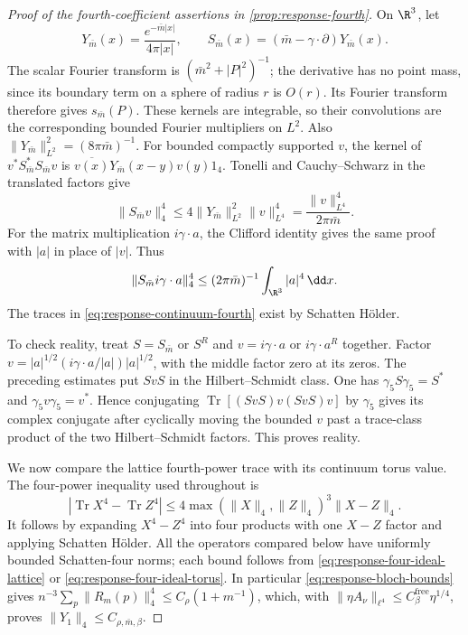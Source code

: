 \documentclass[11pt,letterpaper,reqno]{amsart}
\begin{document}
\begin{proof}[Proof of the fourth-coefficient assertions in \cref{prop:response-fourth}]
On $\R^3$, let
\[
 Y_{\bar m}(x)=\frac{e^{-\bar m|x|}}{4\pi|x|},\qquad
 S_{\bar m}(x)=(\bar m-\gamma\cdot\partial)Y_{\bar m}(x).
\]
The scalar Fourier transform is $(\bar m^2+|P|^2)^{-1}$;
the derivative has no point mass, since its boundary
term on a sphere of radius $r$ is $O(r)$. Its Fourier
transform therefore gives $s_{\bar m}(P)$. These kernels
are integrable, so their convolutions are the corresponding
bounded Fourier multipliers on $L^2$. Also
$\|Y_{\bar m}\|_{L^2}^2=(8\pi\bar m)^{-1}$.
For bounded compactly supported $v$, the kernel of
$v^*S_{\bar m}^*S_{\bar m}v$ is
$\overline{v(x)}Y_{\bar m}(x-y)v(y)1_4$. Tonelli and
Cauchy--Schwarz in the translated factors give
\[
 \|S_{\bar m}v\|_4^4
   \le4\|Y_{\bar m}\|_{L^2}^2\|v\|_{L^4}^4
   =\frac{\|v\|_{L^4}^4}{2\pi\bar m}.
\]
For the matrix multiplication $i\gamma\cdot a$, the
Clifford identity gives the same proof with $|a|$ in
place of $|v|$. Thus
\begin{equation}\label{eq:response-four-ideal-infinite}
 \|S_{\bar m}i\gamma\cdot a\|_4^4\le
                    (2\pi\bar m)^{-1}\int_{\R^3}|a|^4\,\dd x.
\end{equation}
The traces in
\eqref{eq:response-continuum-fourth} exist by Schatten
H\"older.

To check reality, treat $S=S_{\bar m}$ or $S^R$ and
$v=i\gamma\cdot a$ or $i\gamma\cdot a^R$ together.
Factor $v=|a|^{1/2}(i\gamma\cdot a/|a|)|a|^{1/2}$,
with the middle factor zero at its zeros. The preceding
estimates put $SvS$ in the Hilbert--Schmidt class.
One has $\gamma_5S\gamma_5=S^*$ and
$\gamma_5v\gamma_5=v^*$. Hence conjugating
$\operatorname{Tr}[(SvS)v(SvS)v]$ by $\gamma_5$ gives
its complex conjugate after cyclically moving the
bounded $v$ past a trace-class product of the two
Hilbert--Schmidt factors. This proves reality.

We now compare the lattice fourth-power trace with its
continuum torus value. The four-power inequality used
throughout is
\begin{equation}\label{eq:response-fourth-trace-difference}
 |\operatorname{Tr}X^4-\operatorname{Tr}Z^4|
 \le4\max(\|X\|_4,\|Z\|_4)^3\|X-Z\|_4.
\end{equation}
It follows by expanding $X^4-Z^4$ into four products
with one $X-Z$ factor and applying Schatten H\"older.
All the operators compared below have uniformly bounded
Schatten-four norms; each bound follows from
\eqref{eq:response-four-ideal-lattice} or
\eqref{eq:response-four-ideal-torus}. In particular
\eqref{eq:response-bloch-bounds} gives
$n^{-3}\sum_p\|R_m(p)\|_4^4\le
C_\rho(1+m^{-1})$, which, with
$\|\eta A_\nu\|_{\ell^4}\le C_\beta^{\mathrm{free}}\eta^{1/4}$,
proves $\|Y_1\|_4\le C_{\rho,\bar m,\beta}$.


\end{proof}
\end{document}
